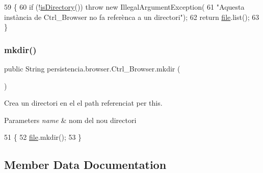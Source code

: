 \begin{DoxyCode}
59                            \{
60         \textcolor{keywordflow}{if} (!\hyperlink{classpersistencia_1_1browser_1_1Ctrl__Browser_abdf13ea9a8d928b1efc6f3a69e18f6c6}{isDirectory}()) \textcolor{keywordflow}{throw} \textcolor{keyword}{new} IllegalArgumentException(
61             \textcolor{stringliteral}{"Aquesta instància de Ctrl\_Browser no fa referènca a un directori"});
62         \textcolor{keywordflow}{return} \hyperlink{classpersistencia_1_1browser_1_1Ctrl__Browser_a72c151aed575c0848f7dbb1609b373c8}{file}.list();
63     \}
\end{DoxyCode}
\mbox{\label{classpersistencia_1_1browser_1_1Ctrl__Browser_a947773ee38a780bae338aa0e4f396f6f}} 
\subsubsection{\texorpdfstring{mkdir()}{mkdir()}}
{\footnotesize\ttfamily public String persistencia.\+browser.\+Ctrl\+\_\+\+Browser.\+mkdir (\begin{DoxyParamCaption}{ }\end{DoxyParamCaption})\hspace{0.3cm}{\ttfamily [inline]}}



Crea un directori en el el path referenciat per this. 


\begin{DoxyParams}{Parameters}
{\em name} & nom del nou directori \\
\hline
\end{DoxyParams}

\begin{DoxyCode}
51                         \{
52         \hyperlink{classpersistencia_1_1browser_1_1Ctrl__Browser_a72c151aed575c0848f7dbb1609b373c8}{file}.mkdir();
53     \}
\end{DoxyCode}


\subsection{Member Data Documentation}
\mbox{\label{classpersistencia_1_1browser_1_1Ctrl__Browser_a72c151aed575c0848f7dbb1609b373c8}} 
